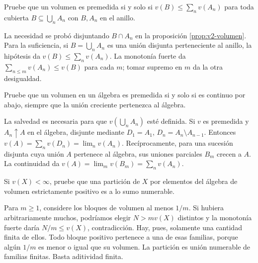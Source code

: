 \begin{ejercicio}\label{ej:v2-l05-2}
Pruebe que un volumen es premedida si y solo si $v(B)\le\sum_nv(A_n)$ para toda cubierta $B\subseteq\bigcup_nA_n$ con $B,A_n$ en el anillo.
\end{ejercicio}
\begin{solucion}
La necesidad se probó disjuntando $B\cap A_n$ en la proposición \ref{prop:v2-volumen}. Para la suficiencia, si $B=\bigcup_nA_n$ es una unión disjunta perteneciente al anillo, la hipótesis da $v(B)\le\sum_nv(A_n)$. La monotonía fuerte da $\sum_{n\le m}v(A_n)\le v(B)$ para cada $m$; tomar supremo en $m$ da la otra desigualdad.
\end{solucion}

\begin{ejercicio}\label{ej:v2-l05-3}
Pruebe que un volumen en un álgebra es premedida si y solo si es continuo por abajo, siempre que la unión creciente pertenezca al álgebra.
\end{ejercicio}
\begin{solucion}
La salvedad es necesaria para que $v(\bigcup_nA_n)$ esté definida. Si $v$ es premedida y $A_n\uparrow A$ en el álgebra, disjunte mediante $D_1=A_1$, $D_n=A_n\setminus A_{n-1}$. Entonces $v(A)=\sum_nv(D_n)=\lim_nv(A_n)$. Recíprocamente, para una sucesión disjunta cuya unión $A$ pertenece al álgebra, sus uniones parciales $B_m$ crecen a $A$. La continuidad da $v(A)=\lim_mv(B_m)=\sum_nv(A_n)$.
\end{solucion}

\begin{ejercicio}\label{ej:v2-l05-4}
Si $v(X)<\infty$, pruebe que una partición de $X$ por elementos del álgebra de volumen estrictamente positivo es a lo sumo numerable.
\end{ejercicio}
\begin{solucion}
Para $m\ge1$, considere los bloques de volumen al menos $1/m$. Si hubiera arbitrariamente muchos, podríamos elegir $N>m v(X)$ distintos y la monotonía fuerte daría $N/m\le v(X)$, contradicción. Hay, pues, solamente una cantidad finita de ellos. Todo bloque positivo pertenece a una de esas familias, porque algún $1/m$ es menor o igual que su volumen. La partición es unión numerable de familias finitas. Basta aditividad finita.
\end{solucion}

